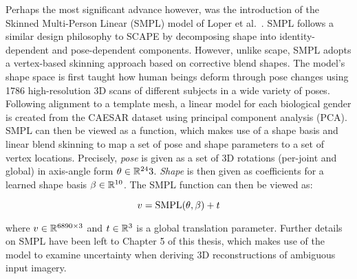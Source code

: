 Perhaps the most significant advance however, was the introduction of the Skinned Multi-Person Linear (SMPL) model of Loper et al.~\cite{loper15smpl}. SMPL follows a similar design philosophy to SCAPE by decomposing shape into identity-dependent and pose-dependent components. However, unlike scape, SMPL adopts a vertex-based skinning approach based on corrective blend shapes. The model's shape space is first taught how human beings deform through pose changes using 1786 high-resolution 3D scans of different subjects in a wide variety of poses. Following alignment to a template mesh, a linear model for each biological gender is created from the CAESAR dataset \cite{robinette2002civilian} using principal component analysis (PCA). SMPL can then be viewed as a function, which makes use of a shape basis and linear blend skinning to map a set of pose and shape parameters to a set of vertex locations. Precisely, \emph{pose} is given as a set of 3D rotations (per-joint and global) in axis-angle form $\theta \in {\mathbb{R}^{24}}{3}$. \emph{Shape} is then given as coefficients for a learned shape basis $\beta \in {\mathbb{R}^{10}}$. The SMPL function can then be viewed as:

\begin{equation}
    v = \operatorname{SMPL}(\theta, \beta) + t
\end{equation}

where $v \in {\mathbb{R}^{6890 \times 3}}$ and $t \in {\mathbb{R}^{3}}$ is a global translation parameter. Further details on SMPL have been left to Chapter 5 of this thesis, which makes use of the model to examine uncertainty when deriving 3D reconstructions of ambiguous input imagery.



